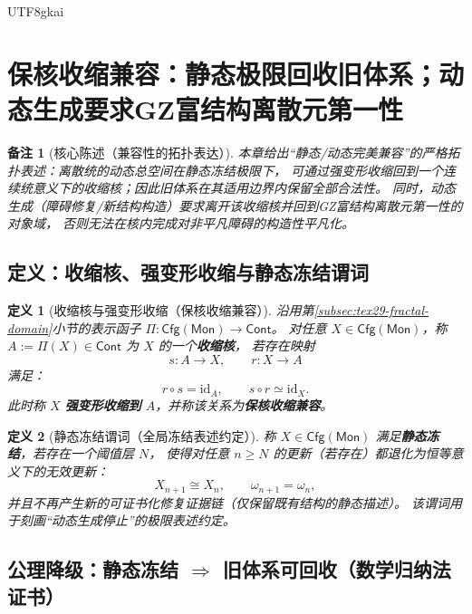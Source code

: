 \documentclass[12pt]{article}
\newtheorem{definition}{定义}[section]
\newtheorem{remark}{备注}[section]
\newcommand{\KouJing}{\texorpdfstring{表述约定}{表述约定}}
\newcommand{\GZMonFull}{\texorpdfstring{GZ富结构离散元}{GZ富结构离散元}}
\newcommand{\GZMon}{\texorpdfstring{GZ富结构离散元}{GZ富结构离散元}}
\begin{document}
\begin{CJK*}{UTF8}{gkai}
\clearpage

\section{保核收缩兼容：静态极限回收旧体系；动态生成要求\GZMonFull{}第一性}
\label{sec:tex29-ch8}

\begin{remark}[核心陈述（兼容性的拓扑表达）]
本章给出“静态/动态完美兼容”的严格拓扑表述：离散统的动态总空间在静态冻结极限下，
可通过强变形收缩回到一个连续统意义下的收缩核；因此旧体系在其适用边界内保留全部合法性。
同时，动态生成（障碍修复/新结构构造）要求离开该收缩核并回到\GZMon{}第一性的对象域，
否则无法在核内完成对非平凡障碍的构造性平凡化。
\end{remark}

\subsection{定义：收缩核、强变形收缩与静态冻结谓词}
\label{subsec:tex29-core-contraction-defs}

\begin{definition}[收缩核与强变形收缩（保核收缩兼容）]
沿用第\ref{subsec:tex29-fractal-domain}小节的表示函子 $\Pi:\mathsf{Cfg}(\mathsf{Mon})\to\mathsf{Cont}$。
对任意 $X\in\mathsf{Cfg}(\mathsf{Mon})$，称 $A:=\Pi(X)\in\mathsf{Cont}$ 为 $X$ 的一个\textbf{收缩核}，
若存在映射
\[
  s:A\to X,\qquad r:X\to A
\]
满足：
\[
  r\circ s=\mathrm{id}_A,\qquad s\circ r\simeq \mathrm{id}_X.
\]
此时称 $X$ \textbf{强变形收缩到} $A$，并称该关系为\textbf{保核收缩兼容}。
\end{definition}

\begin{definition}[静态冻结谓词（全局冻结\KouJing）]
称 $X\in\mathsf{Cfg}(\mathsf{Mon})$ 满足\textbf{静态冻结}，若存在一个阈值层 $N$，
使得对任意 $n\ge N$ 的更新（若存在）都退化为恒等意义下的无效更新：
\[
  X_{n+1}\cong X_n,\qquad \omega_{n+1}=\omega_n,
\]
并且不再产生新的可证书化修复证据链（仅保留既有结构的静态描述）。
该谓词用于刻画“动态生成停止”的极限\KouJing。
\end{definition}

\subsection{公理降级：静态冻结 \texorpdfstring{$\Rightarrow$}{=>} 旧体系可回收（数学归纳法证书）}
\label{subsec:tex29-core-contraction-theorem}


\end{CJK*}
\end{document}
